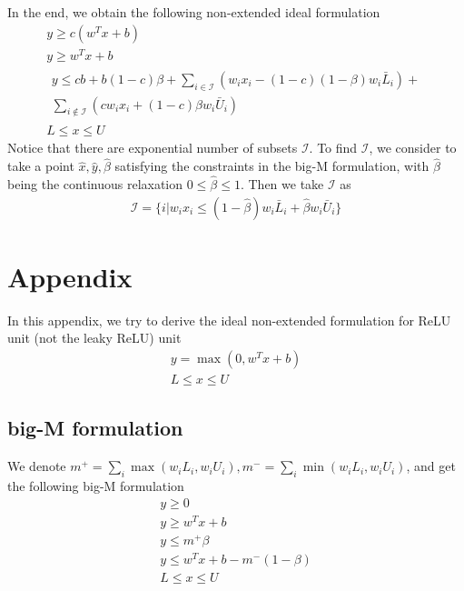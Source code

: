 \documentclass{article}
\begin{document}
In the end, we obtain the following non-extended ideal formulation
\begin{subequations}
\begin{align}
	y \ge c(w^Tx+b)\label{eq:leaky_relu_nonextended_ideal1}\\
	y \ge w^Tx+b\label{eq:leaky_relu_nonextended_ideal2}\\
	\begin{split}
		y \le cb + b(1-c)\beta + \sum_{i\in\mathcal{I}}\left(w_ix_i -(1-c)(1-\beta)w_i\bar{L}_i\right) +\\ \sum_{i\notin\mathcal{I}}\left(cw_ix_i + (1-c)\beta w_i\bar{U}_i\right)\label{eq:leaky_relu_nonextended_ideal3}
	\end{split}\\
	L\le x \le U\label{eq:leaky_relu_nonextended_ideal4}
\end{align}
\end{subequations}
Notice that there are exponential number of subsets $\mathcal{I}$. To find $\mathcal{I}$, we consider to take a point $\hat{x}, \hat{y}, \hat{\beta}$ satisfying the constraints in the big-M formulation, with $\hat{\beta}$ being the continuous relaxation $0 \le \hat{\beta} \le 1$. Then we take $\mathcal{I}$ as
\begin{align}
	\mathcal{I} = \{i|w_i\hat{x}_i \le (1-\hat{\beta})w_i\bar{L}_i + \hat{\beta}w_i\bar{U}_i\}
\end{align}


\section{Appendix}
In this appendix, we try to derive the ideal non-extended formulation for ReLU unit (not the leaky ReLU) unit 
\begin{subequations}
\begin{align}
	y = \max(0, w^Tx + b)\\
	L \le x \le U
\end{align}
\end{subequations}
\subsection{big-M formulation}
We denote $m^+ = \sum_i \max(w_iL_i, w_iU_i), m^- = \sum_i \min(w_iL_i, w_iU_i)$, and get the following big-M formulation
\begin{subequations}
\begin{align}
	y \ge 0\\
	y \ge w^Tx + b\\
	y \le m^+\beta\\
	y \le w^Tx+b - m^-(1-\beta)\\
	L \le x \le U
\end{align}
\end{subequations}
\end{document}
